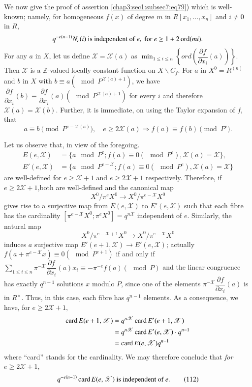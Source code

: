 We now give the proof of assertion \ref{chap3:sec1:subsec7:eq79})
which is well-known; 
name\-ly, for homogeneous $f(x)$ of degree $m$ in
$R[x_{1},\ldots,x_{n}]$ and $i\neq 0$ in $R$,
$$
q^{-e(n-1)}N_{e}(i) \text{ is independent of } e, \text{ for } e\geq
1+2\operatorname{ord} (mi).
$$
For any $a$ in $X$, let us define $\mathscr{X}=\mathscr{X}(a)$ as
${\displaystyle{\mathop{\min}_{1\leq i\leq n}}}\left\{ord\left(\dfrac{\partial f}{\partial
  x_{i}}(a)\right)\right\}$. Then $\mathscr{X}$ is a
$\mathbb{Z}$-valued locally constant function on $X\backslash
C_{f}$. For $a$ in $X^{0}=R^{(n)}$ and $b$ in $X$ with $b\equiv a(\mod
P^{\mathscr{X}(a)+1})$, we have $\dfrac{\partial f}{\partial
  x_{i}}(b)\equiv \dfrac{\partial f}{\partial x_{i}}(a)(\mod
P^{\mathscr{X}(a)+1})$ for every $i$ and therefore
$\mathscr{X}(a)=\mathscr{X}(b)$. Further, it is immediate, on using
the Taylor expansion of $f$, that
$$
a\equiv b\pmod{P^{e-\mathscr{X}(a)}},\quad e\geq
2\mathscr{X}(a)\Rightarrow f(a)\equiv f(b)\pmod{P^{e}}.
$$

Let us observe that, in view of the foregoing.
\begin{align*}
  E(e,\mathscr{X}) &= \{a\mod P^{e};f(a)\equiv 0(\mod
  P^{e}),\mathscr{X}(a)=\mathscr{X}\},\\
  E'(e,\mathscr{X}) &= \{a\mod P^{e-\mathscr{X}}; f(a)\equiv 0(\mod
  P^{e}),\mathscr{X}(a)=\mathscr{X}\} 
\end{align*}
are well-defined for $e\geq \mathscr{X}+1$ and $e\geq 2\mathscr{X}+1$
respectively. Therefore, if $e\geq 2\mathscr{X}+1$,\pageoriginale both
are well-defined and the canonical map
$$
X^{0}/\pi^{e}X^{0}\to X^{0}/\pi^{e-\mathscr{X}}X^{0}
$$
gives rise to a surjective map from $E(e,\mathscr{X})$ to
$E'(e,\mathscr{X})$ such that each fibre has the cardinality
$[\pi^{e-\mathscr{X}}X^{0};\pi^{e}X^{0}]=q^{n\mathscr{X}}$ independent
  of $e$. Similarly, the natural map
$$
X^{0}/\pi^{e-\mathscr{X}+1}X^{0}\to X^{0}/\pi^{e-\mathscr{X}}X^{0}
$$
induces $a$ surjective map $E'(e+1,\mathscr{X})\to E'(e,\mathscr{X})$;
actually $f(a+\pi^{e-\mathscr{X}}x)\equiv 0(\mod P^{e+1})$ if and only
if $\sum\limits_{1\leq i\leq n}\pi^{-\mathscr{X}}\dfrac{\partial
  f}{\partial x_{i}}(a)x_{i}\equiv -\pi^{-e}f(a)(\mod P)$ and the
linear congruence has exactly $q^{n-1}$ solutions $x$ modulo $P$,
since one of the elements $\pi^{-\mathscr{X}}\dfrac{\partial
  f}{\partial x_{i}}(a)$ is in $R^{\times}$. Thus, in this case, each
fibre has $q^{n-1}$ elements. As a consequence, we have, for $e\geq
2\mathscr{X}+1$, 
\begin{align*}
\operatorname{card} E(e+1,\mathscr{X}) &= q^{n\mathscr{X}}\operatorname{card}
E'(e+1,\mathscr{X})\\
&= q^{n\mathscr{X}}\operatorname{card} E'(e,\mathscr{X})\cdot q^{n-1}\\
&= \operatorname{card} E(e,\mathscr{X})q^{n-1}
\end{align*}
where ``card'' stands for the cardinality. We may therefore conclude
that {\em for} $e\geq 2\mathscr{X}+1$,
\begin{equation*}
q^{-e(n-1)}\operatorname{card} E(e,\mathscr{X})\text{ is independent of }
e.\tag{112}\label{chap3:sec5:subsec3:eq112}
\end{equation*}

